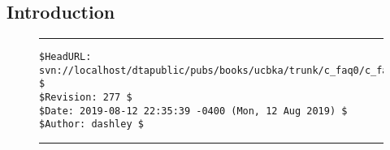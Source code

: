 
\chapter[\cfaqzeroshorttitle{}]{\cfaqzerolongtitle{}}

\label{cfaq0}


\section{Introduction}



\noindent\begin{figure}[!b]
\noindent\rule[-0.25in]{\textwidth}{1pt}
\begin{tiny}
\begin{verbatim}
$HeadURL: svn://localhost/dtapublic/pubs/books/ucbka/trunk/c_faq0/c_faq0.tex $
$Revision: 277 $
$Date: 2019-08-12 22:35:39 -0400 (Mon, 12 Aug 2019) $
$Author: dashley $
\end{verbatim}
\end{tiny}
\noindent\rule[0.25in]{\textwidth}{1pt}
\end{figure}

%
